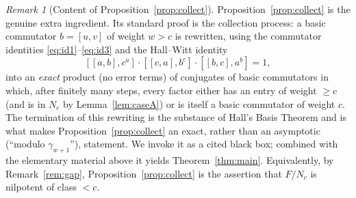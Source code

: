 \documentclass{amsart}
\theoremstyle{definition}
\theoremstyle{remark}
\newtheorem{remark}{Remark}
\begin{document}
\begin{remark}[Content of Proposition~\ref{prop:collect}]\label{rem:collect-why}
Proposition~\ref{prop:collect} is the genuine extra ingredient. Its standard proof
is the collection process: a basic commutator $b=[u,v]$ of weight $w>c$ is
rewritten, using the commutator identities \eqref{eq:id1}--\eqref{eq:id3} and the
Hall--Witt identity
\[
[[a,b],c^{a}]\cdot[[c,a],b^{c}]\cdot[[b,c],a^{b}]=1,
\]
into an \emph{exact} product (no error terms) of conjugates of basic commutators in
which, after finitely many steps, every factor either has an entry of weight $\ge c$
(and is in $N_c$ by Lemma~\ref{lem:caseA}) or is itself a basic commutator of weight
$c$. The termination of this rewriting is the substance of Hall's Basis Theorem and
is what makes Proposition~\ref{prop:collect} an exact, rather than an asymptotic
(``modulo $\gamma_{w+1}$''), statement. We invoke it as a cited black box; combined
with the elementary material above it yields Theorem~\ref{thm:main}. Equivalently,
by Remark~\ref{rem:gap}, Proposition~\ref{prop:collect} is the assertion that
$F/N_c$ is nilpotent of class $<c$.
\end{remark}
\end{document}
